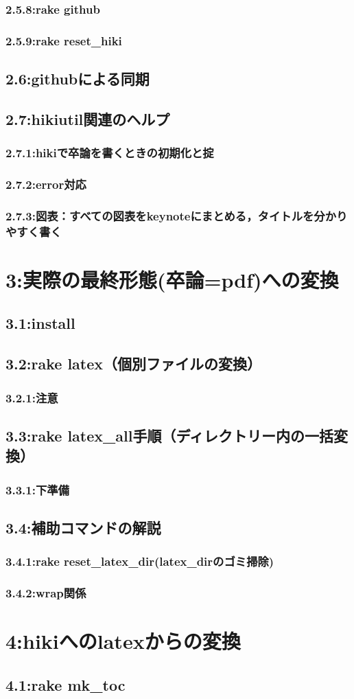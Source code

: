 \subsubsection{2.5.8:rake github}
\subsubsection{2.5.9:rake reset\_hiki}
\subsection{2.6:githubによる同期}
\subsection{2.7:hikiutil関連のヘルプ}
\subsubsection{2.7.1:hikiで卒論を書くときの初期化と掟}
\subsubsection{2.7.2:error対応}
\subsubsection{2.7.3:図表：すべての図表をkeynoteにまとめる，タイトルを分かりやすく書く}
\section{3:実際の最終形態(卒論=pdf)への変換}
\subsection{3.1:install}
\subsection{3.2:rake latex（個別ファイルの変換）}
\subsubsection{3.2.1:注意}
\subsection{3.3:rake latex\_all手順（ディレクトリー内の一括変換）}
\subsubsection{3.3.1:下準備}
\subsection{3.4:補助コマンドの解説}
\subsubsection{3.4.1:rake reset\_latex\_dir(latex\_dirのゴミ掃除)}
\subsubsection{3.4.2:wrap関係}
\section{4:hikiへのlatexからの変換}
\subsection{4.1:rake mk\_toc}
